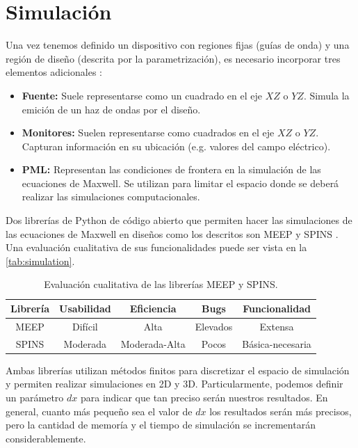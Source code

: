 \section{Simulación}

Una vez tenemos definido un dispositivo con regiones fijas (guías de onda) y una
región de diseño (descrita por la parametrización), es necesario incorporar
tres elementos adicionales \citep{Su2020}:

\begin{itemize}

  \item \textbf{Fuente:} Suele representarse como un cuadrado en el eje $XZ$
    o $YZ$. Simula la emición de un haz de ondas por el diseño.

  \item \textbf{Monitores:} Suelen representarse como cuadrados en el eje $XZ$
    o $YZ$. Capturan información en su ubicación (e.g. valores del campo
    eléctrico).

  \item \textbf{PML:} Representan las condiciones de frontera en la simulación
    de las ecuaciones de Maxwell. Se utilizan para limitar el espacio donde se
    deberá realizar las simulaciones computacionales.

\end{itemize}

Dos librerías de Python de código abierto que permiten hacer las simulaciones
de las ecuaciones de Maxwell en diseños como los descritos son MEEP \citep{Oskooi2010} y SPINS \citep{Su2020}. 
Una evaluación cualitativa de sus funcionalidades puede ser vista en la \autoref{tab:simulation}.

\begin{table}[ht]
    \centering
    \begin{tabular}{|c|c|c|c|c|}
    \hline 
    Librería &  Usabilidad & Eficiencia & Bugs & Funcionalidad \\
    \hline 
    MEEP &  Difícil & Alta & Elevados & Extensa \\
    SPINS &  Moderada  & Moderada-Alta & Pocos & Básica-necesaria \\
    \hline 
    \end{tabular}
    \caption{Evaluación cualitativa de las librerías MEEP y SPINS.}
    \label{tab:simulation}
\end{table}

Ambas librerías utilizan métodos finitos para discretizar el espacio de
simulación y permiten realizar simulaciones en 2D y 3D. 
Particularmente, podemos definir un parámetro $dx$ para indicar que tan preciso
serán nuestros resultados. En general, cuanto más pequeño sea el valor de $dx$
los resultados serán más precisos, pero la cantidad de memoría y el tiempo de
simulación se incrementarán considerablemente.

